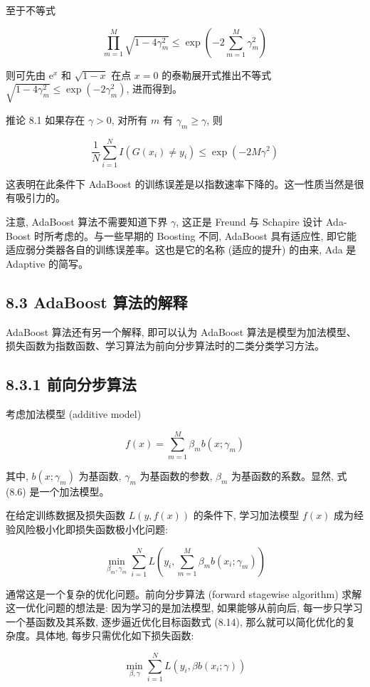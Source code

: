 \documentclass[10pt]{article}
\begin{document}
至于不等式

$$
\prod_{m=1}^{M} \sqrt{1-4 \gamma_{m}^{2}} \leqslant \exp \left(-2 \sum_{m=1}^{M} \gamma_{m}^{2}\right)
$$

则可先由 $\mathrm{e}^{x}$ 和 $\sqrt{1-x}$ 在点 $x=0$ 的泰勒展开式推出不等式 $\sqrt{1-4 \gamma_{m}^{2}} \leqslant \exp \left(-2 \gamma_{m}^{2}\right)$, 进而得到。

推论 8.1 如果存在 $\gamma>0$, 对所有 $m$ 有 $\gamma_{m} \geqslant \gamma$, 则


\begin{equation*}
\frac{1}{N} \sum_{i=1}^{N} I\left(G\left(x_{i}\right) \neq y_{i}\right) \leqslant \exp \left(-2 M \gamma^{2}\right) \tag{8.12}
\end{equation*}


这表明在此条件下 AdaBoost 的训练误差是以指数速率下降的。这一性质当然是很有吸引力的。

注意, AdaBoost 算法不需要知道下界 $\gamma$, 这正是 Freund 与 Schapire 设计 Ada-Boost 时所考虑的。与一些早期的 Boosting 不同, AdaBoost 具有适应性, 即它能适应弱分类器各自的训练误差率。这也是它的名称 (适应的提升) 的由来, Ada 是 Adaptive 的简写。

\subsection*{8.3 AdaBoost 算法的解释}
AdaBoost 算法还有另一个解释, 即可以认为 AdaBoost 算法是模型为加法模型、损失函数为指数函数、学习算法为前向分步算法时的二类分类学习方法。

\subsection*{8.3.1 前向分步算法}
考虑加法模型 (additive model)


\begin{equation*}
f(x)=\sum_{m=1}^{M} \beta_{m} b\left(x ; \gamma_{m}\right) \tag{8.13}
\end{equation*}


其中, $b\left(x ; \gamma_{m}\right)$ 为基函数, $\gamma_{m}$ 为基函数的参数, $\beta_{m}$ 为基函数的系数。显然, 式 (8.6) 是一个加法模型。

在给定训练数据及损失函数 $L(y, f(x))$ 的条件下, 学习加法模型 $f(x)$ 成为经验风险极小化即损失函数极小化问题:


\begin{equation*}
\min _{\beta_{m}, \gamma_{m}} \sum_{i=1}^{N} L\left(y_{i}, \sum_{m=1}^{M} \beta_{m} b\left(x_{i} ; \gamma_{m}\right)\right) \tag{8.14}
\end{equation*}


通常这是一个复杂的优化问题。前向分步算法 (forward stagewise algorithm) 求解这一优化问题的想法是: 因为学习的是加法模型, 如果能够从前向后, 每一步只学习一个基函数及其系数, 逐步逼近优化目标函数式 (8.14), 那么就可以简化优化的复杂度。具体地, 每步只需优化如下损失函数:


\begin{equation*}
\min _{\beta, \gamma} \sum_{i=1}^{N} L\left(y_{i}, \beta b\left(x_{i} ; \gamma\right)\right) \tag{8.15}
\end{equation*}
\end{document}
